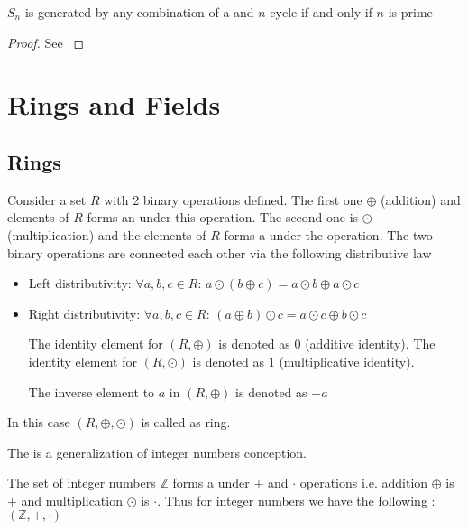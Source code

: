 \begin{appendices}
\begin{corollary}
  $S_n$ is generated by any combination of a  and
  $n$-cycle if and only if $n$ is prime
  \label{cor:sn}
  \begin{proof}
    See \cite{mathstackexchange:sn}
  \end{proof}
\end{corollary}

\section{Rings and Fields}

\subsection{Rings}

\begin{definition}[Ring]
  Consider a set $R$ with 2 binary operations defined. The first one
  $\oplus$ (addition) and elements of $R$ forms an
  under this operation. The second one is $\odot$ (multiplication) and
  the elements of $R$ forms a  under 
  the operation. The two binary operations are connected each other
  via the following distributive law
  \begin{itemize}
  \item Left distributivity:
    $\forall a,b,c \in R$:
    $a \odot \left(b \oplus c\right) =
    a \odot b \oplus a \odot c$
  \item Right distributivity:
    $\forall a,b,c \in R$:
    $\left( a \oplus b \right) \odot c =
    a \odot c \oplus b \odot c$
    
  The identity element for $\left(R, \oplus\right)$ is denoted as $0$
  (additive identity).
  The identity element for $\left(R, \odot\right)$ is denoted as $1$
  (multiplicative identity).

  The inverse element to $a$ in $\left(R, \oplus\right)$ is denoted as $-a$
  \end{itemize}

  In this case $\left(R, \oplus, \odot\right)$ is called as ring.
  \label{def:ring}
\end{definition}

The  is a generalization of integer numbers conception.
\begin{example}
  The set of integer numbers $\mathbb{Z}$ forms a 
  under $+$ and $\cdot$ operations i.e. addition $\oplus$ is
  $+$ and multiplication $\odot$ is $\cdot$. Thus for integer
  numbers we have the following :
  $\left(\mathbb{Z}, +, \cdot\right)$
  \label{ex:ring}
\end{example}


\end{appendices}
